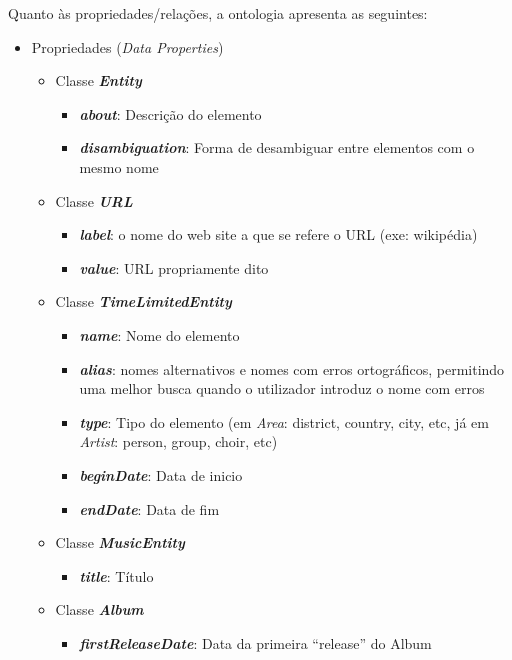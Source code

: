 \documentclass{article}
\begin{document}
Quanto às propriedades/relações, a ontologia apresenta as seguintes:
\begin{itemize}
    \item Propriedades (\textit{Data Properties})
    \begin{itemize}
        \item Classe \textbf{\textit{Entity}}
        \begin{itemize}
            \item \textbf{\textit{about}}: Descrição do elemento
            \item \textbf{\textit{disambiguation}}: Forma de desambiguar entre elementos com o mesmo nome
        \end{itemize}
        \item Classe \textbf{\textit{URL}}
        \begin{itemize}
            \item \textbf{\textit{label}}: o nome do web site a que se refere o URL (exe: wikipédia)
            \item \textbf{\textit{value}}: URL propriamente dito
        \end{itemize}
        \item Classe \textbf{\textit{TimeLimitedEntity}}
        \begin{itemize}
            \item \textbf{\textit{name}}: Nome do elemento
            \item \textbf{\textit{alias}}: nomes alternativos e nomes com erros ortográficos, permitindo uma melhor busca quando o utilizador introduz o nome com erros 
            \item \textbf{\textit{type}}: Tipo do elemento (em \textit{Area}: district, country, city, etc, já em \textit{Artist}: person, group, choir, etc)
            \item \textbf{\textit{beginDate}}: Data de inicio
            \item \textbf{\textit{endDate}}: Data de fim
        \end{itemize}
        \item Classe \textbf{\textit{MusicEntity}}
        \begin{itemize}
            \item \textbf{\textit{title}}: Título
        \end{itemize}
        \item Classe \textbf{\textit{Album}}
        \begin{itemize}
            \item \textbf{\textit{firstReleaseDate}}: Data da primeira ``release'' do Album

\end{itemize}
\end{itemize}
\end{itemize}
\end{document}
